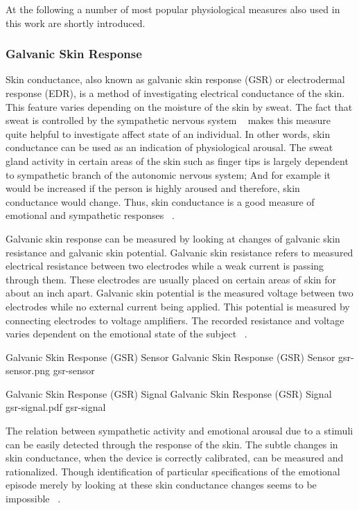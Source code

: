 At the following a number of most popular physiological measures also used in this work are shortly introduced.

\subsubsection{Galvanic Skin Response}
Skin conductance, also known as galvanic skin response (GSR) or electrodermal response (EDR), is a method of investigating electrical conductance of the skin. This feature varies depending on the moisture of the skin by sweat. The fact that sweat is controlled by the sympathetic nervous system ~\cite{seiger2002essentials} makes this measure quite helpful to investigate affect state of an individual. In other words, skin conductance can be used as an indication of physiological arousal. The sweat gland activity in certain areas of the skin such as finger tips is largely dependent to sympathetic branch of the autonomic nervous system; And for example it would be increased if the person is highly aroused and therefore, skin conductance would change. Thus, skin conductance is a good measure of emotional and sympathetic responses ~\cite{carlson2013physiology}.

Galvanic skin response can be measured by looking at changes of galvanic skin resistance and galvanic skin potential. Galvanic skin resistance refers to measured electrical resistance between two electrodes while a weak current is passing through them. These electrodes are usually placed on certain areas of skin for about an inch apart. Galvanic skin potential is the measured voltage between two electrodes while no external current being applied. This potential is measured by connecting electrodes to voltage amplifiers. The recorded resistance and voltage varies dependent on the emotional state of the subject ~\cite{pflanzer2013galvanic}.

\img
{Galvanic Skin Response (GSR) Sensor}
{Galvanic Skin Response (GSR) Sensor}
{gsr-sensor.png}
{gsr-sensor}

\img
{Galvanic Skin Response (GSR) Signal}
{Galvanic Skin Response (GSR) Signal ~\cite{wiki2014gsr}}
{gsr-signal.pdf}
{gsr-signal}

The relation between sympathetic activity and emotional arousal due to a stimuli can be easily detected through the response of the skin. The subtle changes in skin conductance, when the device is correctly calibrated, can be measured and rationalized. Though identification of particular specifications of the emotional episode merely by looking at these skin conductance changes seems to be impossible ~\cite{pflanzer2013galvanic}.

